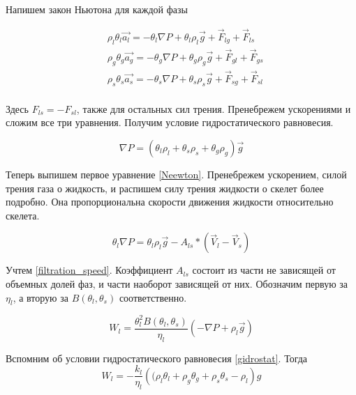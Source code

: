 \documentclass[12pt,a4paper]{article}
\begin{document}
Напишем закон Ньютона для каждой фазы

\begin{equation}
\begin{aligned}
&\rho_l \theta_l \vec{a_l} = - \theta_l \nabla P + \theta_l \rho_l \vec{g} + \vec{F}_{lg} + \vec{F}_{ls}\\
&\rho_g \theta_g \vec{a_g} = - \theta_g \nabla P + \theta_g \rho_g \vec{g} + \vec{F}_{gl} + \vec{F}_{gs}\\
&\rho_s \theta_s \vec{a_s} = - \theta_s \nabla P + \theta_s \rho_s \vec{g} + \vec{F}_{sg} + \vec{F}_{sl}\\
\end{aligned}
\label{Neewton}
\end{equation}

Здесь $F_{ls} = -F_{sl}$, также для остальных сил трения. Пренебрежем ускорениями и сложим все три уравнения. Получим условие гидростатического равновесия.

\begin{equation}
\nabla P = \left( \theta_l \rho_l + \theta_s \rho_s + \theta_g \rho_g \right) \vec g
\label{gidrostat}
\end{equation}

Теперь выпишем первое уравнение \eqref{Neewton}. Пренебрежем ускорением, силой трения газа о жидкость, и распишем силу трения жидкости о скелет более подробно. Она пропорциональна скорости движения жидкости относительно скелета.

\begin{equation*}
\theta_l \nabla P = \theta_l \rho_l \vec{g} - A_{ls} * \left(\vec V_l - \vec V_s \right)
\end{equation*}

Учтем \eqref{filtration_speed}. Коэффициент $A_{ls}$ состоит из части не зависящей от объемных долей фаз, и части наоборот зависящей от них. Обозначим первую за $\eta_l$, а вторую за $B(\theta_l, \theta_s)$ соответственно.

\begin{equation}
W_l = \frac{\theta_l^2 B(\theta_l, \theta_s)}{\eta_l} \left(-\nabla P + \rho_l \vec g\right)
\end{equation}

Вспомним об условии гидростатического равновесия \eqref{gidrostat}. Тогда
\begin{equation}
W_l =  -\frac{k_l}{\eta_l} \left((\rho_l \theta_l + \rho_g \theta_g + \rho_s \theta_s - \rho_l\right) g
\end{equation}
\end{document}
